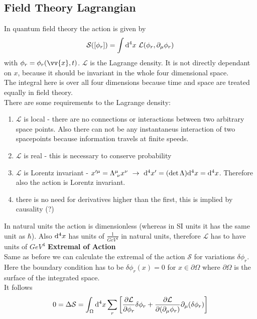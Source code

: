 \documentclass{include/thesisclass}
\newcommand{\LL}{\mathcal{L}}
\newcommand{\SSS}{\mathcal{S}}
\newcommand{\vx}{\vv{x}}
\newcommand{\df}{\rightarrow}
\newcommand{\dd}{{\rm d}}
\newcommand{\p}{\partial}
\begin{document}
\subsection{Field Theory Lagrangian}
In quantum field theory the action is given by
\[ \SSS([\phi_r]) = \int \dd ^4 x~\mathcal{L}(\phi_r, \p_\mu \phi_r)\]
with $\phi_r = \phi_r(\vx, t)$. $\LL$ is the Lagrange density. It is not directly dependant on $x$, because it should be invariant in the whole four dimensional space.\\
The integral here is over all four dimensions because time and space are treated equally in field theory.\\
There are some requirements to the Lagrange density:
\begin{enumerate}
\item $\LL$ is local - there are no connections or interactions between two arbitrary space points. Also there can not be any instantaneus interaction of two spacepoints because information travels at finite speeds.
\item $\LL$ is real - this is necessary to conserve probability
\item $\LL$ is Lorentz invariant - $x'^\mu = \Lambda^\mu_{~\nu}x^\nu ~\df~ \dd^4 x' = (\det \Lambda) \dd^4 x = \dd ^4 x$. Therefore also the action is Lorentz invariant.
\item there is no need for derivatives higher than the first, this is implied by causality (?)
\end{enumerate}
In natural units the action is dimensionless (whereas in SI units it has the same unit as $\hbar$). Also $\dd^4 x$ has units of $\si{\frac{1}{GeV^4}}$ in natural units, therefore $\LL$ has to have units of $\si{GeV}^4$
\newline\newline
\textbf{Extremal of Action}\\
Same as before we can calculate the extremal of the action $\SSS$ for variations $\delta \phi_r$. Here the boundary condition has to be $\delta \phi_r(x) = 0$ for $x \in \p \Omega$ where $\p \Omega$ is the surface of the integrated space.\\
It follows
\[ 0 = \Delta \SSS = \int_\Omega \dd ^4 x \sum_r \left[ \frac{\p \LL}{\p \phi_r} \delta \phi_r + \frac{ \p \LL}{\p (\p_\mu \phi_r)} \p_\mu(\delta \phi_r) \right]\]
\end{document}
